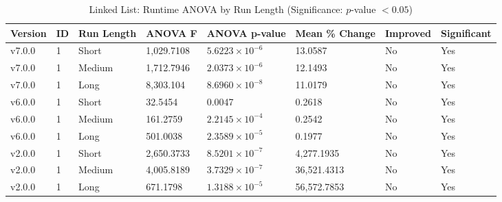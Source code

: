 \begin{table}[H]\caption{Linked List: Runtime ANOVA by Run Length (Significance: $p$-value $<0.05$)}
\centering\footnotesize\setlength{\tabcolsep}{4pt}\renewcommand{\arraystretch}{1.15}
\begin{tabular}{llllllll}
\toprule
Version & ID & Run Length & ANOVA F & ANOVA p-value & Mean \% Change & Improved & Significant \\ \midrule
v7.0.0 & 1 & Short & 1,029.7108 & $5.6223\times10^{-6}$ & 13.0587 & No & Yes \\
v7.0.0 & 1 & Medium & 1,712.7946 & $2.0373\times10^{-6}$ & 12.1493 & No & Yes \\
v7.0.0 & 1 & Long & 8,303.104 & $8.6960\times10^{-8}$ & 11.0179 & No & Yes \\
v6.0.0 & 1 & Short & 32.5454 & 0.0047 & 0.2618 & No & Yes \\
v6.0.0 & 1 & Medium & 161.2759 & $2.2145\times10^{-4}$ & 0.2542 & No & Yes \\
v6.0.0 & 1 & Long & 501.0038 & $2.3589\times10^{-5}$ & 0.1977 & No & Yes \\
v2.0.0 & 1 & Short & 2,650.3733 & $8.5201\times10^{-7}$ & 4,277.1935 & No & Yes \\
v2.0.0 & 1 & Medium & 4,005.8189 & $3.7329\times10^{-7}$ & 36,521.4313 & No & Yes \\
v2.0.0 & 1 & Long & 671.1798 & $1.3188\times10^{-5}$ & 56,572.7853 & No & Yes \\
\bottomrule\end{tabular}
\label{AnovaLinkedList}
\par\smallskip\parbox{0.95\textwidth}{\scriptsize}
\end{table}


